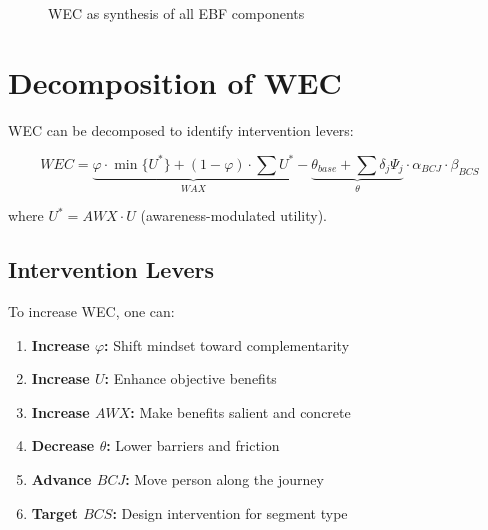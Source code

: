 \begin{figure}[h]
\centering
{}
\caption{WEC as synthesis of all EBF components}
\label{fig:wec-synthesis}
\end{figure}

\section{Decomposition of WEC}

WEC can be decomposed to identify intervention levers:

\begin{equation}
WEC = \underbrace{\varphi \cdot \min\{U^*\} + (1-\varphi) \cdot \sum U^*}_{WAX} 
    - \underbrace{\theta_{base} + \sum \delta_j \Psi_j}_{\theta}
    \cdot \alpha_{BCJ} \cdot \beta_{BCS}
\end{equation}

where $U^* = AWX \cdot U$ (awareness-modulated utility).

\subsection{Intervention Levers}

To increase WEC, one can:
\begin{enumerate}
    \item \textbf{Increase $\varphi$:} Shift mindset toward complementarity
    \item \textbf{Increase $U$:} Enhance objective benefits
    \item \textbf{Increase $AWX$:} Make benefits salient and concrete
    \item \textbf{Decrease $\theta$:} Lower barriers and friction
    \item \textbf{Advance $BCJ$:} Move person along the journey
    \item \textbf{Target $BCS$:} Design intervention for segment type
\end{enumerate}

